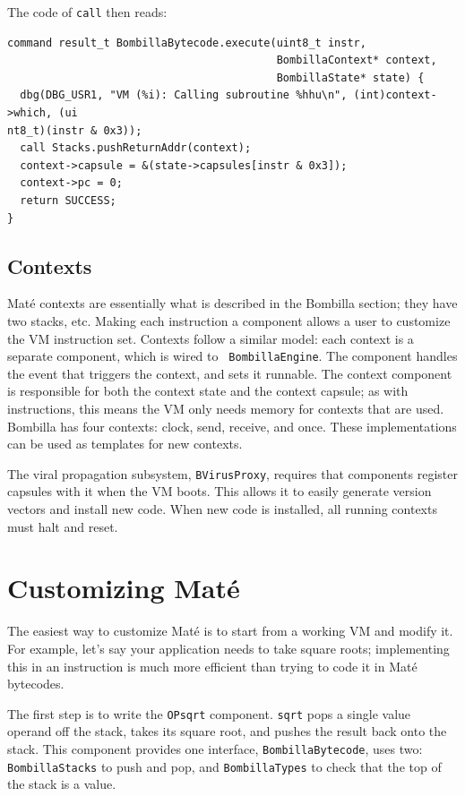 \documentclass[10pt]{article}
\newcommand{\mate}{Mat\'{e}\xspace}
\newcommand{\bomb}{Bombilla\xspace}
\begin{document}
The code of {\tt call} then reads:

\begin{verbatim}
command result_t BombillaBytecode.execute(uint8_t instr,
                                          BombillaContext* context,
                                          BombillaState* state) {
  dbg(DBG_USR1, "VM (%i): Calling subroutine %hhu\n", (int)context->which, (ui
nt8_t)(instr & 0x3));
  call Stacks.pushReturnAddr(context);
  context->capsule = &(state->capsules[instr & 0x3]);
  context->pc = 0;
  return SUCCESS;
}
\end{verbatim}

\subsection{Contexts}

\mate contexts are essentially what is described in the \bomb section;
they have two stacks, etc. Making each instruction a component allows
a user to customize the VM instruction set. Contexts follow a similar
model: each context is a separate component, which is wired to {\tt
BombillaEngine}. The component handles the event that triggers the
context, and sets it runnable. The context component is responsible
for both the context state and the context capsule; as with
instructions, this means the VM only needs memory for contexts that
are used. \bomb has four contexts: clock, send, receive, and
once. These implementations can be used as templates for new contexts.

The viral propagation subsystem, {\tt BVirusProxy}, requires that
components register capsules with it when the VM boots. This allows it
to easily generate version vectors and install new code. When new code
is installed, all running contexts must halt and reset. 

\section{Customizing \mate}
\label{sec:extending}

The easiest way to customize \mate is to start from a working VM and
modify it. For example, let's say your application needs to take
square roots; implementing this in an instruction is much more
efficient than trying to code it in \mate bytecodes.

The first step is to write the {\tt OPsqrt} component. {\tt sqrt} pops
a single value operand off the stack, takes its square root, and
pushes the result back onto the stack. This component provides one
interface, {\tt BombillaBytecode}, uses two: {\tt BombillaStacks} to
push and pop, and {\tt BombillaTypes} to check that the top of the
stack is a value.
\end{document}
